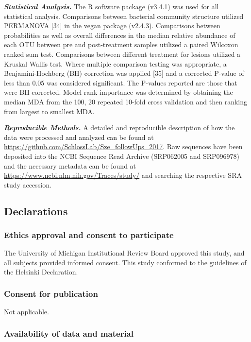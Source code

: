 \documentclass[12pt,]{article}
\begin{document}
\textbf{\emph{Statistical Analysis.}} The R software package (v3.4.1)
was used for all statistical analysis. Comparisons between bacterial
community structure utilized PERMANOVA {[}34{]} in the vegan package
(v2.4.3). Comparisons between probabilities as well as overall
differences in the median relative abundance of each OTU between pre and
post-treatment samples utilized a paired Wilcoxon ranked sum test.
Comparisons between different treatment for lesions utilized a Kruskal
Wallis test. Where multiple comparison testing was appropriate, a
Benjamini-Hochberg (BH) correction was applied {[}35{]} and a corrected
P-value of less than 0.05 was considered significant. The P-values
reported are those that were BH corrected. Model rank importance was
determined by obtaining the median MDA from the 100, 20 repeated 10-fold
cross validation and then ranking from largest to smallest MDA.

\textbf{\emph{Reproducible Methods.}} A detailed and reproducible
description of how the data were processed and analyzed can be found at
\url{https://github.com/SchlossLab/Sze_followUps_2017}. Raw sequences
have been deposited into the NCBI Sequence Read Archive (SRP062005 and
SRP096978) and the necessary metadata can be found at
\url{https://www.ncbi.nlm.nih.gov/Traces/study/} and searching the
respective SRA study accession.

\newpage

\subsection{Declarations}\label{declarations}

\subsubsection{Ethics approval and consent to
participate}\label{ethics-approval-and-consent-to-participate}

The University of Michigan Institutional Review Board approved this
study, and all subjects provided informed consent. This study conformed
to the guidelines of the Helsinki Declaration.

\subsubsection{Consent for publication}\label{consent-for-publication}

Not applicable.

\subsubsection{Availability of data and
material}\label{availability-of-data-and-material}
\end{document}
